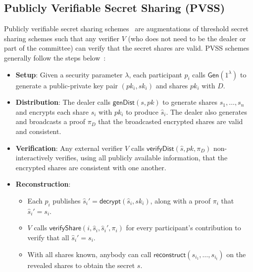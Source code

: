 \subsection{Publicly Verifiable Secret Sharing (PVSS)}
Publicly verifiable secret sharing schemes~\cite{first_pvss_chor, pvss_stadler, pvss_schoenmakers,pvss_paillier_ruiz,pvss_pairings_heidervand,pvss_scrape} are augmentations of threshold secret sharing schemes such that any verifier $V$ (who does not need to be the dealer or part of the committee) can verify that the secret shares are valid.
PVSS schemes generally follow the steps below~\cite{pvss_scrape}:
\begin{itemize}
    \item \textbf{Setup}:
    Given a security parameter $\lambda$, each participant $p_i$ calls $\textsf{Gen}(1^{\lambda})$ to generate a public-private key pair $(pk_i, sk_i)$ and shares $pk_i$ with $D$.
    \item \textbf{Distribution}:
    The dealer calls $\textsf{genDist}(s, pk)$ to generate shares $s_1, \dots, s_n$ and encrypts each share $s_i$ with $pk_i$ to produce $\hat{s}_i$.
    The dealer also generates and broadcasts a proof $\pi_D$ that the broadcasted encrypted shares are valid and consistent.
    \item \textbf{Verification}:
    Any external verifier $V$ calls $\textsf{verifyDist}(\hat{s}, pk, \pi_D)$ non-interactively verifies, using all publicly available information, that the encrypted shares are consistent with one another.
    \item \textbf{Reconstruction}:
        \begin{itemize}
            \item Each $p_i$ publishes $\hat{s}_i' = \textsf{decrypt}(\hat{s}_i, sk_i)$, along with a proof $\pi_i$ that $\hat{s}_i' = s_i$.
            \item $V$ calls $\textsf{verifyShare}(i, \hat{s}_i, \hat{s}_i', \pi_i)$ for every participant's contribution to verify that all $\hat{s}_i' = s_i$.
            \item With all shares known, anybody can call $\textsf{reconstruct}(s_{i_1}, \dots, s_{i_t})$ on the revealed shares to obtain the secret $s$.
        \end{itemize} 
\end{itemize}

